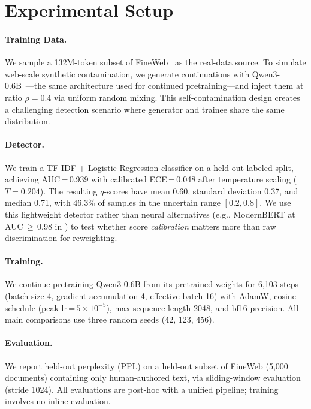 \section{Experimental Setup}
\label{sec:experiments}

\paragraph{Training Data.}
We sample a 132M-token subset of FineWeb~\citep{penedo_2024_fineweb} as the real-data source.
To simulate web-scale synthetic contamination, we generate continuations with Qwen3-0.6B~\citep{yang_2025_qwen3}---the same architecture used for continued pretraining---and inject them at ratio $\rho = 0.4$ via uniform random mixing.
This self-contamination design creates a challenging detection scenario where generator and trainee share the same distribution.

\paragraph{Detector.}
We train a TF-IDF + Logistic Regression classifier on a held-out labeled split, achieving AUC\,=\,0.939 with calibrated ECE\,=\,0.048 after temperature scaling ($T = 0.204$).
The resulting $q$-scores have mean 0.60, standard deviation 0.37, and median 0.71, with 46.3\% of samples in the uncertain range $[0.2, 0.8]$.
We use this lightweight detector rather than neural alternatives (e.g., ModernBERT at AUC\,${\geq}$\,0.98 in \citealt{drayson_2025_detection_collapse}) to test whether score \emph{calibration} matters more than raw discrimination for reweighting.

\paragraph{Training.}
We continue pretraining Qwen3-0.6B from its pretrained weights for 6{,}103 steps (batch size 4, gradient accumulation 4, effective batch 16) with AdamW, cosine schedule (peak lr\,=\,$5{\times}10^{-5}$), max sequence length 2048, and bf16 precision.
All main comparisons use three random seeds (42, 123, 456).

\paragraph{Evaluation.}
We report held-out perplexity (PPL) on a held-out subset of FineWeb (5{,}000 documents) containing only human-authored text, via sliding-window evaluation (stride 1024).
All evaluations are post-hoc with a unified pipeline; training involves no inline evaluation.

